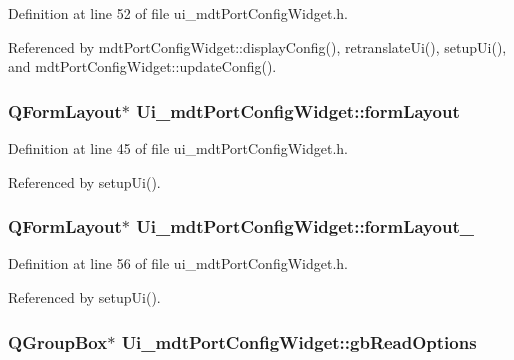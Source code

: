 Definition at line 52 of file ui\-\_\-mdt\-Port\-Config\-Widget.\-h.



Referenced by mdt\-Port\-Config\-Widget\-::display\-Config(), retranslate\-Ui(), setup\-Ui(), and mdt\-Port\-Config\-Widget\-::update\-Config().

\hypertarget{class_ui__mdt_port_config_widget_a1679d7bc8690fb1f4bcf59c92f53b572}{
\subsubsection[{form\-Layout}]{\setlength{\rightskip}{0pt plus 5cm}Q\-Form\-Layout$\ast$ Ui\-\_\-mdt\-Port\-Config\-Widget\-::form\-Layout}}\label{class_ui__mdt_port_config_widget_a1679d7bc8690fb1f4bcf59c92f53b572}


Definition at line 45 of file ui\-\_\-mdt\-Port\-Config\-Widget.\-h.



Referenced by setup\-Ui().

\hypertarget{class_ui__mdt_port_config_widget_a725fa4f3de7a04873c6f1d8b40757dd7}{
\subsubsection[{form\-Layout\-\_\-2}]{\setlength{\rightskip}{0pt plus 5cm}Q\-Form\-Layout$\ast$ Ui\-\_\-mdt\-Port\-Config\-Widget\-::form\-Layout\-\_}}\label{class_ui__mdt_port_config_widget_a725fa4f3de7a04873c6f1d8b40757dd7}


Definition at line 56 of file ui\-\_\-mdt\-Port\-Config\-Widget.\-h.



Referenced by setup\-Ui().

\hypertarget{class_ui__mdt_port_config_widget_a14fd5ecbe4eb1666678e44a646a06fd3}{
\subsubsection[{gb\-Read\-Options}]{\setlength{\rightskip}{0pt plus 5cm}Q\-Group\-Box$\ast$ Ui\-\_\-mdt\-Port\-Config\-Widget\-::gb\-Read\-Options}}\label{class_ui__mdt_port_config_widget_a14fd5ecbe4eb1666678e44a646a06fd3}


